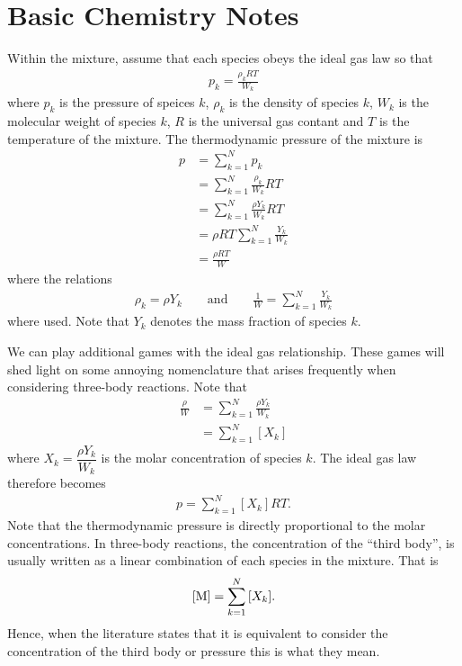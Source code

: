\section{Basic Chemistry Notes}

Within the mixture, assume that each species obeys the 
ideal gas law so that 
\begin{align}
  p_{k} = \frac{\rho_{k}RT}{W_{k}}
\end{align}
where $p_{k}$ is the pressure of speices $k$, 
$\rho_{k}$ is the density of species $k$, $W_{k}$ 
is the molecular weight of species $k$, $R$ is the 
universal gas contant and $T$ is the temperature of the 
mixture.  The thermodynamic pressure of the mixture is 
\begin{align*}
  p &= \sum_{k=1}^{N}{p_{k}} \\
    &= \sum_{k=1}^{N}{\frac{\rho_{k}}{W_{k}}}RT \\
    &= \sum_{k=1}^{N}{\frac{\rho Y_{k}}{W_{k}}RT} \\
    &= \rho R T \sum_{k=1}^{N}{\frac{Y_{k}}{W_{k}}} \\
    &= \frac{\rho R T}{W}
\end{align*}
where the relations 
\begin{align}
  \rho_{k} = \rho Y_{k} \qquad \text{and} \qquad 
  \frac{1}{W} = \sum_{k=1}^{N}{\frac{Y_{k}}{W_{k}}}
\end{align}
where used.  Note that $Y_{k}$ denotes the mass 
fraction of species $k$.

We can play additional games with the ideal gas 
relationship.  These games will shed light on 
some annoying nomenclature that arises frequently 
when considering three-body reactions.  Note that 
\begin{align}
  \frac{\rho}{W} &= \sum_{k=1}^{N}{\frac{\rho Y_{k}}{W_{k}}} \\
                 &= \sum_{k=1}^{N}{\left[X_{k}\right]}
\end{align}
where $X_{k} = \dfrac{\rho Y_{k}}{W_{k}}$ is the molar 
concentration of species $k$.  The ideal gas law therefore 
becomes 
\begin{align}
  p = \sum_{k=1}^{N}{\left[X_{k}\right]}RT.
\end{align}
Note that the thermodynamic pressure is directly 
proportional to the molar concentrations.  In 
three-body reactions, the concentration of the 
``third body'',  is usually written as a linear 
combination of each species in the mixture.  That is 
\begin{align}
  \left[\ce{M}\right] = \sum_{k=1}^{N}{\left[X_{k}\right]}.
\end{align}
Hence, when the literature states that it is equivalent 
to consider the concentration of the third body or 
pressure this is what they mean.

